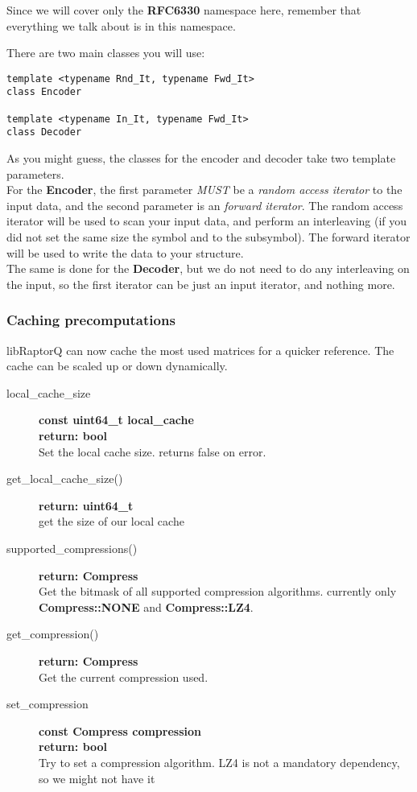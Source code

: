 \documentclass[11pt,a4paper]{refart}
\begin{document}
Since we will cover only the \textbf{RFC6330} namespace here, remember that everything we talk about is in this namespace.

\newpage

There are two main classes you will use:
\begin{verbatim}
template <typename Rnd_It, typename Fwd_It>
class Encoder

template <typename In_It, typename Fwd_It>
class Decoder
\end{verbatim}

As you might guess, the classes for the encoder and decoder take two template parameters.\\
For the \textbf{Encoder}, the first parameter \textit{MUST} be a \textit{random access iterator} to the input data, and the second parameter is an
\textit{forward iterator}. The random access iterator will be used to scan your input data, and perform an interleaving (if you did not set the same size the
symbol and to the subsymbol). The forward iterator will be used to write the data to your structure.\\
The same is done for the \textbf{Decoder}, but we do not need to do any interleaving on the input, so the first iterator can be just an input iterator,
and nothing more.

\subsubsection{Caching precomputations}
libRaptorQ can now cache the most used matrices for a quicker reference. The cache can be scaled up or down dynamically.

\begin{description}

\item[local\_cache\_size] \textbf{const uint64\_t local\_cache}\\
\textbf{return: bool}\\
Set the local cache size. returns false on error.

\item[get\_local\_cache\_size()] \textbf{return: uint64\_t}\\
get the size of our local cache

\item[supported\_compressions()] \textbf{return: Compress} \\
Get the bitmask of all supported compression algorithms. currently only \textbf{Compress::NONE} and \textbf{Compress::LZ4}.

\item[get\_compression()] \textbf{return: Compress} \\
Get the current compression used.

\item [set\_compression] \textbf{const Compress compression} \\
\textbf{return: bool}\\
Try to set a compression algorithm. LZ4 is not a mandatory dependency, so we might not have it

\end{description}
\end{document}
